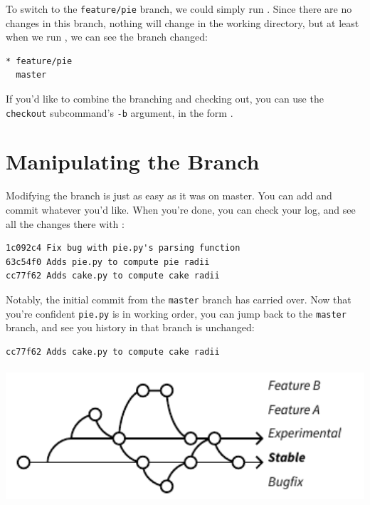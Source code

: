 \documentclass[11pt,letterpaper,twoside]{report}
\begin{document}
To switch to the \texttt{feature/pie} branch, we could simply run
. Since there are no changes in this branch,
nothing will change in the working directory, but at least when we run
, we can see the branch changed:

\begin{lstlisting}[numbers=none]
* feature/pie
  master
\end{lstlisting}

If you'd like to combine the branching and checking out, you can use the
\texttt{checkout} subcommand's \texttt{-b} argument, in the form
.

\section{Manipulating the Branch}

Modifying the branch is just as easy as it was on master. You can add and commit
whatever you'd like. When you're done, you can check your log, and see all the
changes there with :

\begin{lstlisting}[numbers=none]
1c092c4 Fix bug with pie.py's parsing function
63c54f0 Adds pie.py to compute pie radii
cc77f62 Adds cake.py to compute cake radii
\end{lstlisting}

Notably, the initial commit from the \texttt{master} branch has carried over.
Now that you're confident \texttt{pie.py} is in working order, you can jump back
to the \texttt{master} branch, and see you history in that branch is unchanged:

\begin{lstlisting}[numbers=none]
cc77f62 Adds cake.py to compute cake radii
\end{lstlisting}

\vspace{\fill}
\begin{center}
\includegraphics[height=5cm]{resources/example_branching.pdf}
\end{center}
\vspace*{\fill}
\end{document}
